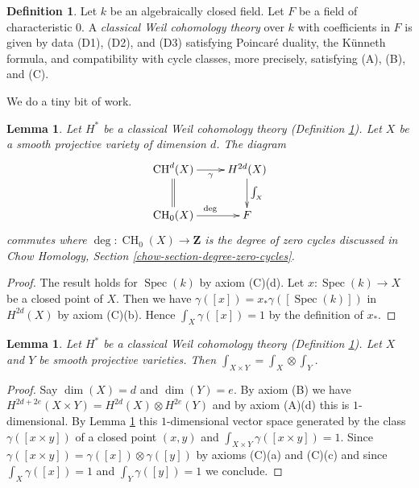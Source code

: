 \documentclass{stacks-project}
\theoremstyle{plain}
\newtheorem{lemma}[subsection]{Lemma}
\theoremstyle{definition}
\newtheorem{definition}[subsection]{Definition}
\theoremstyle{remark}
\numberwithin{equation}{subsection}
\def\Spec{\mathop{\mathrm{Spec}}}
\def\CH{\mathop{\mathrm{CH}}\nolimits}
\begin{document}
\begin{definition}
\label{definition-weil-cohomology-theory-classical}
Let $k$ be an algebraically closed field.
Let $F$ be a field of characteristic $0$.
A {\it classical Weil cohomology theory} over $k$ with coefficients in $F$
is given by data (D1), (D2), and (D3) satisfying
Poincar\'e duality, the K\"unneth formula, and compatibility
with cycle classes, more precisely, satisfying (A), (B), and (C).
\end{definition}

\noindent
We do a tiny bit of work.

\begin{lemma}
\label{lemma-degrees-cycles-classical}
Let $H^*$ be a classical Weil cohomology theory
(Definition \ref{definition-weil-cohomology-theory-classical}).
Let $X$ be a smooth projective variety of dimension $d$. The diagram
$$
\xymatrix{
\CH^d(X) \ar[r]_-\gamma \ar@{=}[d] &
H^{2d}(X) \ar[d]^{\int_X} \\
\CH_0(X) \ar[r]^\deg & F
}
$$
commutes where $\deg : \CH_0(X) \to \mathbf{Z}$ is the degree of
zero cycles discussed in Chow Homology, Section
\ref{chow-section-degree-zero-cycles}.
\end{lemma}

\begin{proof}
The result holds for $\Spec(k)$ by axiom (C)(d). Let $x : \Spec(k) \to X$
be a closed point of $X$. Then we have $\gamma([x]) = x_*\gamma([\Spec(k)])$
in $H^{2d}(X)$ by axiom (C)(b). Hence $\int_X \gamma([x]) = 1$ by the
definition of $x_*$.
\end{proof}

\begin{lemma}
\label{lemma-trace-product-classical}
Let $H^*$ be a classical Weil cohomology theory
(Definition \ref{definition-weil-cohomology-theory-classical}).
Let $X$ and $Y$ be smooth projective varieties.
Then $\int_{X \times Y} = \int_X \otimes \int_Y$.
\end{lemma}

\begin{proof}
Say $\dim(X) = d$ and $\dim(Y) = e$. By axiom (B) we have
$H^{2d + 2e}(X \times Y) = H^{2d}(X) \otimes H^{2e}(Y)$
and by axiom (A)(d) this is $1$-dimensional.
By Lemma \ref{lemma-degrees-cycles-classical}
this $1$-dimensional vector space generated by the
class $\gamma([x \times y])$ of a closed point $(x, y)$ and
$\int_{X \times Y} \gamma([x \times y]) = 1$.
Since $\gamma([x \times y]) = \gamma([x]) \otimes \gamma([y])$
by axioms (C)(a) and (C)(c) and since $\int_X \gamma([x]) = 1$ and
$\int_Y \gamma([y]) = 1$ we conclude.
\end{proof}
\end{document}
